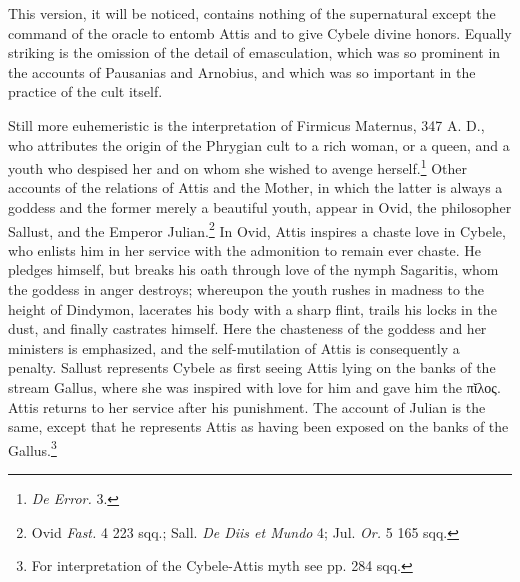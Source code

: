 \documentclass[a4paper, 11pt, oneside, polutonikogreek, english]{article}
\begin{document}
This version, it will be noticed, contains nothing of the supernatural except the command of the oracle to entomb Attis and to give Cybele divine honors. Equally striking is the omission of the detail of emasculation, which was so prominent in the accounts of Pausanias and Arnobius, and which was so important in the practice of the cult itself.

Still more euhemeristic is the interpretation of Firmicus Maternus, 347 A. D., who attributes the origin of the Phrygian cult to a rich woman, or a queen, and a youth who despised her and on whom she wished to avenge herself.\footnote{\emph{De Error.} 3.} Other accounts of the relations of Attis and the Mother, in which the latter is always a goddess and the former merely a beautiful youth, appear in Ovid, the philosopher Sallust, and the Emperor Julian.\footnote{Ovid \emph{Fast.} 4 223 sqq.; Sall. \emph{De Diis et Mundo} 4; Jul. \emph{Or.} 5 165 sqq.} In Ovid, Attis inspires a chaste love in Cybele, who enlists him in her service with the admonition to remain ever chaste. He pledges himself, but breaks his oath through love of the nymph Sagaritis, whom the goddess in anger destroys; whereupon the youth rushes in madness to the height of Dindymon, lacerates his body with a sharp flint, trails his locks in the dust, and finally castrates himself. Here the chasteness of the goddess and her ministers is emphasized, and the self-mutilation of Attis is consequently a penalty. Sallust represents Cybele as first seeing Attis lying on the banks of the stream Gallus, where she was inspired with love for him and gave him the πῐλος. Attis returns to her service after his punishment. The account of Julian is the same, except that he represents Attis as having been exposed on the banks of the Gallus.\footnote{For interpretation of the Cybele-Attis myth see pp. 284 sqq.}
\end{document}
